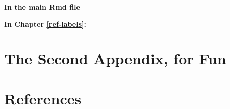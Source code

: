 \documentclass[11pt,twoside]{bristolthesis}
\begin{document}
\textbf{In the main Rmd file}

\textbf{In Chapter \ref{ref-labels}:}

\hypertarget{the-second-appendix-for-fun}{%
\chapter{The Second Appendix, for Fun}\label{the-second-appendix-for-fun}}

\backmatter

\hypertarget{references}{%
\chapter*{References}\label{references}}


\noindent

\setlength{\parindent}{-0.20in}
\setlength{\leftskip}{0.20in}
\setlength{\parskip}{8pt}
\end{document}
